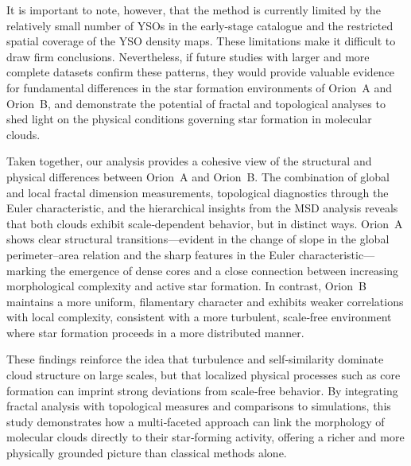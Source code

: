 It is important to note, however, that the method is currently limited by the relatively small number of YSOs in the early-stage catalogue and the restricted spatial coverage of the YSO density maps. These limitations make it difficult to draw firm conclusions. Nevertheless, if future studies with larger and more complete datasets confirm these patterns, they would provide valuable evidence for fundamental differences in the star formation environments of Orion~A and Orion~B, and demonstrate the potential of fractal and topological analyses to shed light on the physical conditions governing star formation in molecular clouds.

Taken together, our analysis provides a cohesive view of the structural and physical differences between Orion~A and Orion~B.  
The combination of global and local fractal dimension measurements, topological diagnostics through the Euler characteristic, and the hierarchical insights from the MSD analysis reveals that both clouds exhibit scale‑dependent behavior, but in distinct ways.  
Orion~A shows clear structural transitions—evident in the change of slope in the global perimeter–area relation and the sharp features in the Euler characteristic—marking the emergence of dense cores and a close connection between increasing morphological complexity and active star formation.  
In contrast, Orion~B maintains a more uniform, filamentary character and exhibits weaker correlations with local complexity, consistent with a more turbulent, scale‑free environment where star formation proceeds in a more distributed manner.  

These findings reinforce the idea that turbulence and self‑similarity dominate cloud structure on large scales, but that localized physical processes such as core formation can imprint strong deviations from scale‑free behavior.  
By integrating fractal analysis with topological measures and comparisons to simulations, this study demonstrates how a multi‑faceted approach can link the morphology of molecular clouds directly to their star‑forming activity, offering a richer and more physically grounded picture than classical methods alone.